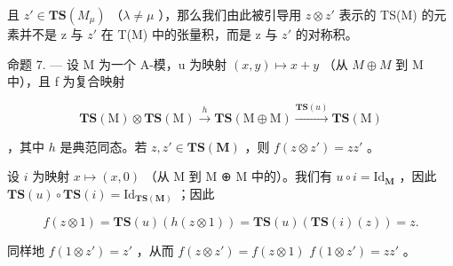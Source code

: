 且 \(z' \in \mathbf{TS}(M_{\mu})\) （\(\lambda \neq \mu\) ），那么我们由此被引导用 \(z \otimes z'\) 表示的 TS(M) 的元素并不是 z 与 \(z'\) 在 T(M) 中的张量积，而是 z 与 \(z'\) 的对称积。

命题 7. --- 设 M 为一个 A-模，u 为映射 \((x, y) \mapsto x + y\) （从 \(M \oplus M\) 到 M 中），且 f 为复合映射

\[
\mathbf {T S} (\mathrm{M}) \otimes \mathbf {T S} (\mathrm{M}) \xrightarrow {h} \mathbf {T S} (\mathrm{M} \oplus \mathrm{M}) \xrightarrow {\mathbf {T S} (u)} \mathbf {T S} (\mathrm{M})
\]

，其中 \(h\) 是典范同态。若 \(z, z' \in \mathbf{TS}(\mathbf{M})\) ，则 \(f(z \otimes z') = zz'\) 。

设 \(i\) 为映射 \(x \mapsto (x, 0)\) （从 M 到 M ⊕ M 中的）。我们有 \(u \circ i = \mathrm{Id}_{\mathbf{M}}\) ，因此 \(\mathbf{TS}(u) \circ \mathbf{TS}(i) = \mathrm{Id}_{\mathbf{TS}(\mathbf{M})}\) ；因此

\[
f (z \otimes 1) = \mathbf {T S} (u) (h (z \otimes 1)) = \mathbf {T S} (u) (\mathbf {T S} (i) (z)) = z.
\]

同样地 \(f(1 \otimes z') = z'\) ，从而 \(f(z \otimes z') = f(z \otimes 1)\) \(f(1 \otimes z') = zz'\) 。

